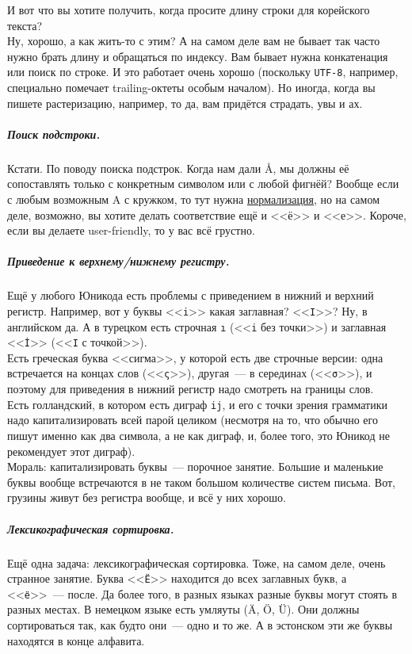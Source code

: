 \documentclass{article}
\begin{document}
    И вот что вы хотите получить, когда просите длину строки для корейского текста?\\
    Ну, хорошо, а как жить-то с этим? А на самом деле вам не бывает так часто нужно брать длину и обращаться по индексу. Вам бывает нужна конкатенация или поиск по строке. И это работает очень хорошо (поскольку \Verb|UTF-8|, например, специально помечает trailing-октеты особым началом). Но иногда, когда вы пишете растеризацию, например, то да, вам придётся страдать, увы и ах.
    \subparagraph{Поиск подстроки.}
    Кстати. По поводу поиска подстрок. Когда нам дали \r{A}, мы должны её сопоставлять только с конкретным символом или с любой фигнёй? Вообще если с любым возможным A с кружком, то тут нужна \href{https://en.wikipedia.org/wiki/Unicode_equivalence#Normalization}{нормализация}, но на самом деле, возможно, вы хотите делать соответствие ещё и <<ё>> и <<е>>. Короче, если вы делаете user-friendly, то у вас всё грустно.
    \subparagraph{Приведение к верхнему/нижнему регистру.}
    Ещё у любого Юникода есть проблемы с приведением в нижний и верхний регистр. Например, вот у буквы <<\Verb|i|>> какая заглавная? <<\Verb|I|>>? Ну, в английском да. А в турецком есть строчная \Verb|ı| (<<\Verb|i| без точки>>) и заглавная <<\Verb|İ|>> (<<\Verb|I| с точкой>>).\\
    Есть греческая буква <<сигма>>, у которой есть две строчные версии: одна встречается на концах слов (<<\Verb|ς|>>), другая~--- в серединах (<<\Verb|σ|>>), и поэтому для приведения в нижний регистр надо смотреть на границы слов.\\
    Есть голландский, в котором есть диграф \Verb|ij|, и его с точки зрения грамматики надо капитализировать всей парой целиком (несмотря на то, что обычно его пишут именно как два символа, а не как диграф, и, более того, это Юникод не рекомендует этот диграф).\\
    Мораль: капитализировать буквы~--- порочное занятие. Большие и маленькие буквы вообще встречаются в не таком большом количестве систем письма. Вот, грузины живут без регистра вообще, и всё у них хорошо.
    \subparagraph{Лексикографическая сортировка.}
    Ещё одна задача: лексикографическая сортировка. Тоже, на самом деле, очень странное занятие. Буква <<\Verb|Ё|>> находится до всех заглавных букв, а <<\Verb|ё|>>~--- после. Да более того, в разных языках разные буквы могут стоять в разных местах. В немецком языке есть умляуты ({\"A}, {\"O}, {\"U}). Они должны сортироваться так, как будто они~--- одно и то же. А в эстонском эти же буквы находятся в конце алфавита.
\end{document}

